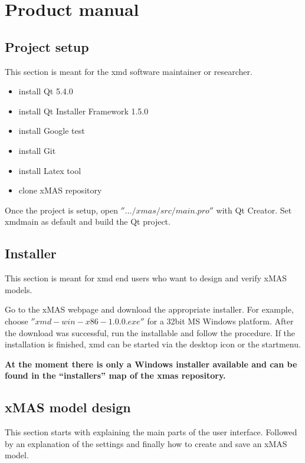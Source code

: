 \chapter{Product manual}

\section{Project setup}
This section is meant for the xmd software maintainer or researcher.

\begin{itemize}
\item install Qt 5.4.0
\item install Qt Installer Framework 1.5.0
\item install Google test
\item install Git
\item install Latex tool
\item clone xMAS repository
\end{itemize}

Once the project is setup, open $''.../xmas/src/main.pro''$ with Qt Creator.
Set xmdmain as default and build the Qt project.

\section{Installer}
This section is meant for xmd end users who want to design and verify xMAS models.

Go to the xMAS webpage and download the appropriate installer. For example,
choose $''xmd-win-x86-1.0.0.exe''$ for a 32bit MS Windows platform. After
the download was successful, run the installable and follow the procedure.
If the installation is finished, xmd can be started via the desktop icon or the startmenu.

\begin{tcolorbox}[colback=white]
\textbf{
At the moment there is only a Windows installer available and can be found in
the ``installers'' map of the xmas repository.
}
\end{tcolorbox}

\section{xMAS model design}
This section starts with explaining the main parts of the user interface.
Followed by an explanation of the settings and finally how to create and save an
xMAS model.

